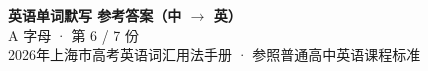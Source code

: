 \documentclass[10pt,a4paper]{article}
\begin{document}
\pagestyle{plain}

\begin{center}
{\LARGE\bfseries 英语单词默写 \quad 参考答案（中 $\to$ 英）}\\[0.22em]
{\large A 字母 · 第 6 / 7 份}\\[0.18em]
{\small 2026年上海市高考英语词汇用法手册 · 参照普通高中英语课程标准}
\end{center}

\vspace{0.2em}
\noindent{\color{rulegray}\rule{\textwidth}{0.8pt}}

\vspace{0.35em}

\vspace{0.25em}
\renewcommand{\arraystretch}{1.32}
\end{document}
